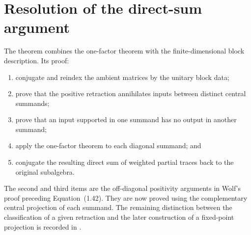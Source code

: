 \documentclass{article}
\begin{document}
\section{Resolution of the direct-sum argument}

The theorem
 combines
the one-factor theorem with the finite-dimensional block description.  Its
proof:
\begin{enumerate}
    \item conjugate and reindex the ambient matrices by the unitary block data;
    \item prove that the positive retraction annihilates inputs between
          distinct central summands;
    \item prove that an input supported in one summand has no output in another
          summand;
    \item apply the one-factor theorem to each diagonal summand; and
    \item conjugate the resulting direct sum of weighted partial traces back to
          the original subalgebra.
\end{enumerate}
The second and third items are the off-diagonal positivity arguments in Wolf's
proof preceding Equation~(1.42).  They are now proved using the complementary
central projection of each summand.  The remaining distinction between the
classification of a given retraction and the later construction of a
fixed-point projection is recorded in
.



\end{document}
